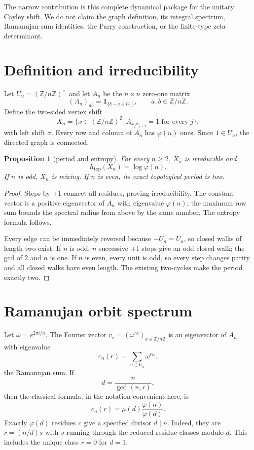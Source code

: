 \documentclass[11pt,a4paper]{amsart}
\newtheorem{proposition}[theorem]{Proposition}
\theoremstyle{definition}
\theoremstyle{remark}
\newcommand{\Z}{\mathbb Z}
\begin{document}
The narrow contribution is this complete dynamical package for the unitary
Cayley shift.  We do not claim the graph definition, its integral spectrum,
Ramanujan-sum identities, the Parry construction, or the finite-type zeta
determinant.

\section{Definition and irreducibility}

Let $U_n=(\Z/n\Z)^\times$ and let $A_n$ be the $n\times n$ zero-one matrix
\[
 (A_n)_{ab}=\mathbf 1_{\{b-a\in U_n\}},
 \qquad a,b\in\Z/n\Z.
\]
Define the two-sided vertex shift
\[
 X_n=\{x\in(\Z/n\Z)^\Z:A_{x_jx_{j+1}}=1\text{ for every }j\},
\]
with left shift $\sigma$.  Every row and column of $A_n$ has
$\varphi(n)$ ones.  Since $1\in U_n$, the directed graph is connected.

\begin{proposition}[period and entropy]\label{prop:period}
For every $n\geq2$, $X_n$ is irreducible and
\[
 h_{\mathrm{top}}(X_n)=\log\varphi(n).
\]
If $n$ is odd, $X_n$ is mixing.  If $n$ is even, its exact topological period
is two.
\end{proposition}

\begin{proof}
Steps by $+1$ connect all residues, proving irreducibility.  The constant
vector is a positive eigenvector of $A_n$ with eigenvalue $\varphi(n)$; the
maximum row sum bounds the spectral radius from above by the same number.
The entropy formula follows.

Every edge can be immediately reversed because $-U_n=U_n$, so closed walks
of length two exist.  If $n$ is odd, $n$ successive $+1$ steps give an odd
closed walk; the gcd of $2$ and $n$ is one.  If $n$ is even, every unit is
odd, so every step changes parity and all closed walks have even length.
The existing two-cycles make the period exactly two.
\end{proof}

\section{Ramanujan orbit spectrum}

Let $\omega=e^{2\pi i/n}$.  The Fourier vector
$v_r=(\omega^{ra})_{a\in\Z/n\Z}$ is an eigenvector of $A_n$ with eigenvalue
\[
 c_n(r)=\sum_{u\in U_n}\omega^{ru},
\]
the Ramanujan sum.  If
\[
 d=\frac{n}{\gcd(n,r)},
\]
then the classical formula, in the notation convenient here, is
\begin{equation}\label{eq:ramanujan}
 c_n(r)=\mu(d)\frac{\varphi(n)}{\varphi(d)}.
\end{equation}
Exactly $\varphi(d)$ residues $r$ give a specified divisor $d\mid n$.
Indeed, they are $r=(n/d)s$ with $s$ running through the reduced residue
classes modulo $d$.  This includes the unique class $r=0$ for $d=1$.
\end{document}
